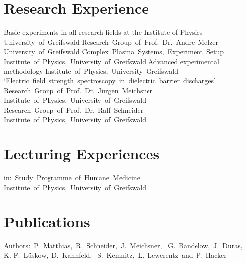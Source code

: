 \documentclass[11pt,a4paper]{moderncv}
\begin{document}
	\newpage
	\section{Research Experience}
					{Basic experiments in all research fields at the Institute of Physics\newline}{}%
					{University~of~Greifswald}{}
					{Research~Group~of~Prof.~Dr.~Andre~Melzer\newline}{}%
					{University~of~Greifswald}{}
					{Complex~Plasma~Systems,~Experiment~Setup\newline}{}%
					{Institute~of~Physics,~University~of~Greifswald}{}
					{Advanced experimental methodology\newline}{}%
					{Institute~of~Physics,~University~Greifswald}{}
					{`Electric~field~strength~spectroscopy~in~dielectric~barrier~discharges'\newline}{}%
					{Research~Group~of~Prof.~Dr.~Jürgen~Meichsner\newline}%
					{Institute~of~Physics,~University~of~Greifswald}
					{Research~Group~of~Prof.~Dr.~Ralf~Schneider\newline}{}%
					{Institute~of~Physics,~University~of~Greifswald}{}
	
	\section{Lecturing Experiences}
											{in:~Study~Programme~of~Humane~Medicine\newline}{}%
											{Institute~of~Physics,~University~of~Greifswald}{}
	
	\section{Publications}
        										{Authors:~P.~Matthias,~R.~Schneider,~J.~Meichsner,~%
														 G.~Bandelow,~J.~Duras,\newline%
														 K.-F.~Lüskow,~D.~Kahnfeld,~%
													   S.~Kemnitz,~L.~Lewerentz~and~P.~Hacker}{}{}{}
	\newpage	
\end{document}
